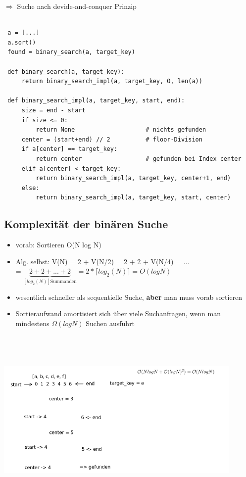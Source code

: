 \documentclass[11pt, fleqn]{scrreprt}
\begin{document}
        $\Rightarrow$ Suche nach devide-and-conquer Prinzip\\
        \begin{verbatim}

 a = [...]
 a.sort()
 found = binary_search(a, target_key)

 def binary_search(a, target_key):
     return binary_search_impl(a, target_key, O, len(a))

 def binary_search_impl(a, target_key, start, end):
     size = end - start
     if size <= 0:
         return None                    # nichts gefunden
     center = (start+end) // 2          # floor-Division
     if a[center] == target_key:
         return center                  # gefunden bei Index center
     elif a[center] < target_key:
         return binary_search_impl(a, target_key, center+1, end)
     else:
         return binary_search_impl(a, target_key, start, center)
        \end{verbatim}

        \subsection*{Komplexität der binären Suche}

        \begin{itemize}
            \item vorab: Sortieren O(N log N)
            \item Alg. selbst: V(N) = 2 + V(N/2) = 2 + 2 + V(N/4) = ...\\
            \hspace*{3cm} = $\underbrace{ 2 + 2 + ... + 2}_{[ log_2(N)] \text{Summanden}} = 2* \lceil log_2 (N) \rceil = O(logN)$
        \end{itemize}
        \begin{itemize}[label={$\Rightarrow$}]
            \item wesentlich schneller als sequentielle Suche, \textbf{aber} man muss vorab sortieren
            \item Sortieraufwand amortisiert sich über viele Suchanfragen, wenn man mindestens $\Omega(log N)$ Suchen ausführt
        \end{itemize}

        \includegraphics[width=12cm,height=9cm,keepaspectratio]{./Pictures/binaereSuche.png}
\end{document}
